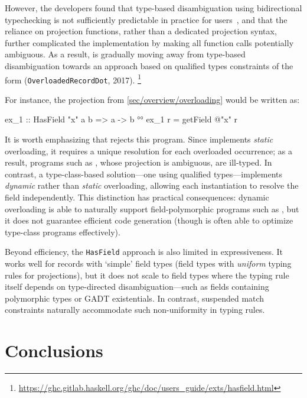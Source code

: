\documentclass[acmsmall,screen,nonacm%
\Anonymous{,anonymous}{}%
\Final{}{,review}%
]{acmart}
\begin{document}
However, the \GHC developers found that type-based disambiguation using
bidirectional typechecking is not sufficiently predictable in practice
for users~\citep*{RFC-overloaded-record-fields}, and that the reliance on
projection functions, rather than a dedicated projection syntax, further
complicated the implementation by making all function calls potentially
ambiguous. As a result, \GHC is gradually moving away from type-based
disambiguation towards an approach based on qualified types constraints of the
form  (\texttt{OverloadedRecordDot}, 2017).%
\footnote{
  \url{https://ghc.gitlab.haskell.org/ghc/doc/users_guide/exts/hasfield.html}
}

For instance, the projection  from \cref{sec/overview/overloading}
would be written as:
%
\begin{program}[input]
ex_1 :: HasField "x" a b => a -> b °°
ex_1 r = getField @"x" r
\end{program}
%
It is worth emphasizing that \OML rejects this program. Since \OML implements
\emph{static} overloading, it requires a unique resolution for each overloaded
occurrence; as a result, programs such as , whose projection is
ambiguous, are ill-typed. In contrast, a type-class-based solution---\ie one
using qualified types---implements \emph{dynamic} rather than \emph{static}
overloading, allowing each instantiation to resolve the field independently.
This distinction has practical consequences: dynamic overloading is able to
naturally support field-polymorphic programs such as , but it does
not guarantee efficient code generation (though \GHC is often able to optimize
type-class programs effectively).


Beyond efficiency, the \texttt{HasField} approach is also limited in
expressiveness. It works well for records with `simple' field types (\ie field
types with \emph{uniform} typing rules for projections), but it does not scale
to field types where the typing rule itself depends on type-directed
disambiguation---such as fields containing polymorphic types or GADT
existentials. In contrast, suspended match constraints naturally accommodate
such non-uniformity in typing rules.

\section{Conclusions}
\label{sec:future-work}
\end{document}
